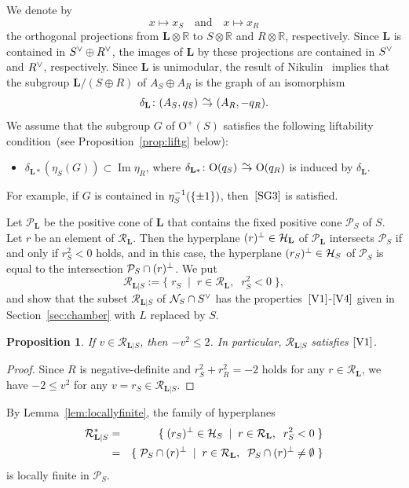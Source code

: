 \documentclass{amsart}
\theoremstyle{plain}
\newtheorem{proposition}[theorem]{Proposition}
\theoremstyle{definition}
\theoremstyle{remark}
\numberwithin{equation}{section}
\numberwithin{table}{section}
\numberwithin{figure}{section}
\newcommand{\R}{\mathord{\mathbb R}}
\newcommand{\HHH}{\mathord{\mathcal H}}
\newcommand{\NNN}{\mathord{\mathcal N}}
\newcommand{\PPP}{\mathord{\mathcal P}}
\newcommand{\RRR}{\mathord{\mathcal R}}
\newcommand{\isom}{\mathbin{\,\raise -.6pt\rlap{$\to$}\raise 3.5pt \hbox{\hskip .3pt$\mathord{\sim}$}\;}}
\newcommand{\set}[2]{\{\; {#1} \; \mid \; {#2} \;  \}}
\newcommand{\tensor}{\otimes}
\newcommand{\inv}{\sp{-1}}
\newcommand{\sperp}{\sp{\perp}}
\newcommand{\dual}{\sp{\vee}}
\newcommand{\OG}{\mathord{\mathrm {O}}}
\newcommand{\Image}{\operatorname{\mathrm {Im}}\nolimits}
\newcommand{\rmand}{\textrm{and}}
\newcommand{\quand}{\quad\rmand\quad}
\renewcommand{\L}{\mathord{\mathbf{L}}}
\newcommand{\Roots}{\RRR}
\newcommand{\sphyp}{\sp*}
\newcommand{\RtsLS}{\Roots_{\L|S}}
\newcommand{\propVone}{\mathord{\rm [V1]}}
\newcommand{\propVfour}{\mathord{\rm [V4]}}
\newcommand{\assumpthree}{\mathord{\rm [SG3]}}
\begin{document}
We denote by
$$
x\mapsto x_S \quand x\mapsto x_R
$$
the orthogonal projections from ${\L}\tensor\R$ to $S\tensor\R$ and $R\tensor\R$,
respectively.
Since ${\L}$ is contained in $S\dual\oplus R\dual$,
the images of ${\L}$ by these projections are contained in $S\dual$ and $R\dual$,
respectively.
Since ${\L}$ is unimodular, the result of Nikulin~\cite[Proposition 1.6.1]{MR525944} implies that
the subgroup ${\L}/(S\oplus R)$ of $A_S\oplus A_R$ is the graph of an isomorphism
$$
\delta_{\L} \colon (A_S, q_S)\isom (A_R, -q_R).
$$
We assume that the subgroup $G$ of $\OG^+(S)$ satisfies 
 the following liftability condition~(see Proposition~\ref{prop:liftg} below):
%
\begin{itemize}
\item[$\assumpthree$]\quad
$\delta_{\L*}(\eta_S(G))\subset \Image \eta_R$, \;\; 
\textrm{where $\delta_{\L*}\colon \OG(q_S)\isom \OG(q_R)$ is induced by $\delta_{\L}$}.
\end{itemize}
%
For example, if $G$ is contained in $\eta_S\inv(\{\pm 1\})$, then~$\assumpthree$ is satisfied.
%
\par
%
Let $\PPP_{\L}$ be 
 the positive cone of $\L$ that contains the fixed positive cone $\PPP_S$ of $S$.
Let $r$ be an element of $\Roots_{\L}$.
Then the hyperplane $(r)\sperp\in \HHH_{\L}$ of $\PPP_{\L}$ intersects $\PPP_S$ if and only if
$r_S^2<0$ holds,
and in this case,
the hyperplane $(r_S)\sperp\in  \HHH_S$ of $\PPP_S$ is equal to the intersection $\PPP_S\cap (r)\sperp$.
We put
$$
\RtsLS:=\set{r_S}{r\in \Roots_{\L},\;\; r_S^2<0}, 
$$
and show that the subset $\RtsLS$ of $\NNN_S\cap S\dual$ has the properties~$\propVone$-$\propVfour$
given in Section~\ref{sec:chamber} with $L$ replaced by $S$.
%
\begin{proposition}
If $v\in  \RtsLS$,  then $-v^2\le 2$.
In particular, $\RtsLS$ satisfies $\propVone$.
\end{proposition}
%
\begin{proof}
Since  $R$ is negative-definite
and $r_S^2+r_R^2=-2$ holds for any $r\in \Roots_{\L}$, 
we have $-2\le v^2$ for any $v=r_S\in \RtsLS$.
\end{proof}
%
By Lemma~\ref{lem:locallyfinite},  the family of hyperplanes
%
\begin{eqnarray*}
\RtsLS\sphyp &=&\set{(r_S)\sperp\in \HHH_S}{r\in \Roots_{\L},\;\; r_S^2<0} \\
&=&\set{\PPP_S\cap (r)\sperp}{r\in \Roots_{\L},\;\; \PPP_S\cap (r)\sperp\ne \emptyset}
\end{eqnarray*}
% 
is locally finite in $\PPP_S$.
\end{document}
